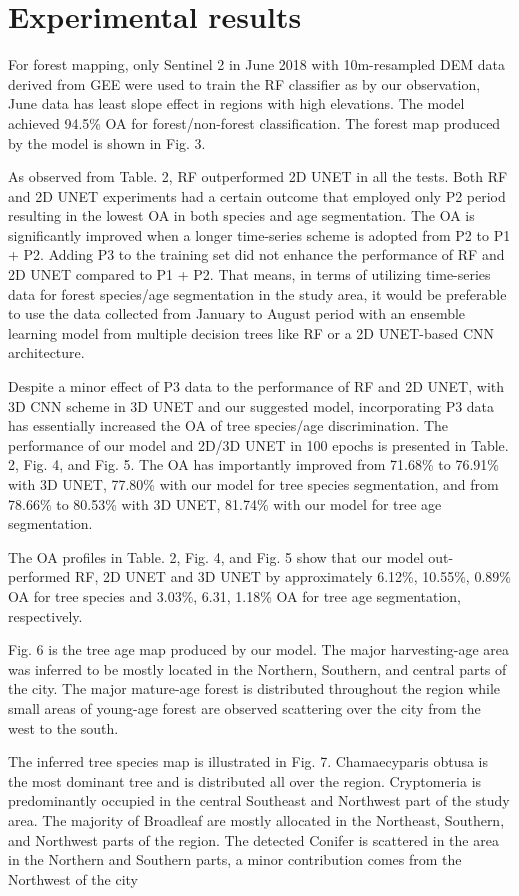 \section{Experimental results} \label{chap5_result}
For forest mapping, only Sentinel 2 in June 2018 with 10m-resampled DEM data derived from GEE were used to train the RF classifier as by our observation, June data has least slope effect in regions with high elevations. The model achieved 94.5\% OA for forest/non-forest classification. The forest map produced by the model is shown in Fig. 3. \par
As observed from Table. 2, RF outperformed 2D UNET in all the tests. Both RF and 2D UNET experiments had a certain outcome that employed only P2 period resulting in the lowest OA in both species and age segmentation. The OA is significantly improved when a longer time-series scheme is adopted from P2 to P1 + P2. Adding P3 to the training set did not enhance the performance of RF and 2D UNET compared to P1 + P2. That means, in terms of utilizing time-series data for forest species/age segmentation in the study area, it would be preferable to use the data collected from January to August period with an ensemble learning model from multiple decision trees like RF or a 2D UNET-based CNN architecture.\par
Despite a minor effect of P3 data to the performance of RF and 2D UNET, with 3D CNN scheme in 3D UNET and our suggested model, incorporating P3 data has essentially increased the OA of tree species/age discrimination. The performance of our model and 2D/3D UNET in 100 epochs is presented in Table. 2, Fig. 4, and Fig. 5. The OA has importantly improved from 71.68\% to 76.91\% with 3D UNET, 77.80\% with our model for tree species segmentation, and from 78.66\% to 80.53\% with 3D UNET, 81.74\% with our model for tree age segmentation. \par
The OA profiles in Table. 2, Fig. 4, and Fig. 5 show that our model out-performed RF, 2D UNET and 3D UNET by approximately 6.12\%, 10.55\%, 0.89\% OA for tree species and 3.03\%, 6.31, 1.18\% OA for tree age segmentation, respectively. \par
Fig. 6 is the tree age map produced by our model. The major harvesting-age area was inferred to be mostly located in the Northern, Southern, and central parts of the city. The major mature-age forest is distributed throughout the region while small areas of young-age forest are observed scattering over the city from the west to the south. \par
The inferred tree species map is illustrated in Fig. 7. Chamaecyparis obtusa is the most dominant tree and is distributed all over the region. Cryptomeria is predominantly occupied in the central Southeast and Northwest part of the study area. The majority of Broadleaf are mostly allocated in the Northeast, Southern, and Northwest parts of the region. The detected Conifer is scattered in the area in the Northern and Southern parts, a minor contribution comes from the Northwest of the city \par

